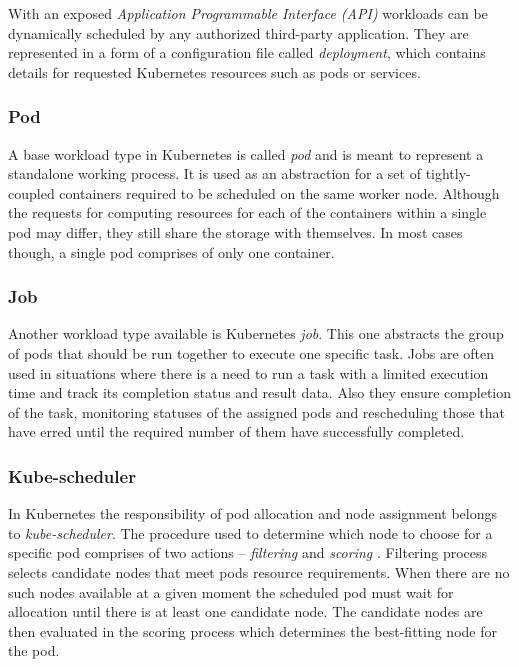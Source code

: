 With an exposed \emph{Application Programmable Interface (API)} workloads can be dynamically scheduled by any authorized third-party application.
They are represented in a form of a configuration file called \emph{deployment}, which contains details for requested Kubernetes resources such as pods or services.




\subsubsection{Pod}\label{s:ProblemDomain:Kubernetes:pod}

A base workload type in Kubernetes is called \emph{pod} and is meant to represent a standalone working process. 
It is used as an abstraction for a set of tightly-coupled containers required to be scheduled on the same worker node.
Although the requests for computing resources for each of the containers within a single pod may differ, they still share the storage with themselves.
In most cases though, a single pod comprises of only one container.




\subsubsection{Job}\label{s:ProblemDomain:Kubernetes:job}

Another workload type available is Kubernetes \emph{job}.
This one abstracts the group of pods that should be run together to execute one specific task.
Jobs are often used in situations where there is a need to run a task with a limited execution time and track its completion status and result data.
Also they ensure completion of the task, monitoring statuses of the assigned pods and rescheduling those that have erred until the required number of them have successfully completed.




\subsubsection{Kube-scheduler}\label{s:ProblemDomain:Kubernetes:scheduler}

In Kubernetes the responsibility of pod allocation and node assignment belongs to \emph{kube-scheduler}.
The procedure used to determine which node to choose for a specific pod comprises of two actions -- \emph{filtering} and \emph{scoring} \cite{b:Kubernetes-scheduler}.
Filtering process selects candidate nodes that meet pods resource requirements.
When there are no such nodes available at a given moment the scheduled pod must wait for allocation until there is at least one candidate node.
The candidate nodes are then evaluated in the scoring process which determines the best-fitting node for the pod.

